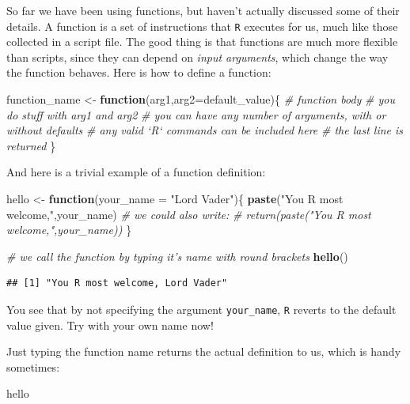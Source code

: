 \documentclass[]{book}
\newenvironment{Shaded}{\begin{snugshade}}{\end{snugshade}}
\newcommand{\KeywordTok}[1]{\textcolor[rgb]{0.13,0.29,0.53}{\textbf{#1}}}
\newcommand{\DataTypeTok}[1]{\textcolor[rgb]{0.13,0.29,0.53}{#1}}
\newcommand{\StringTok}[1]{\textcolor[rgb]{0.31,0.60,0.02}{#1}}
\newcommand{\CommentTok}[1]{\textcolor[rgb]{0.56,0.35,0.01}{\textit{#1}}}
\newcommand{\ControlFlowTok}[1]{\textcolor[rgb]{0.13,0.29,0.53}{\textbf{#1}}}
\newcommand{\NormalTok}[1]{#1}
\begin{document}
So far we have been using functions, but haven't actually discussed some
of their details. A function is a set of instructions that \texttt{R}
executes for us, much like those collected in a script file. The good
thing is that functions are much more flexible than scripts, since they
can depend on \emph{input arguments}, which change the way the function
behaves. Here is how to define a function:

\begin{Shaded}
\begin{Highlighting}[]
\NormalTok{function_name <-}\StringTok{ }\ControlFlowTok{function}\NormalTok{(arg1,}\DataTypeTok{arg2=}\NormalTok{default_value)\{}
  \CommentTok{# function body}
  \CommentTok{# you do stuff with arg1 and arg2}
  \CommentTok{# you can have any number of arguments, with or without defaults}
  \CommentTok{# any valid `R` commands can be included here}
  \CommentTok{# the last line is returned}
\NormalTok{\}}
\end{Highlighting}
\end{Shaded}

And here is a trivial example of a function definition:

\begin{Shaded}
\begin{Highlighting}[]
\NormalTok{hello <-}\StringTok{ }\ControlFlowTok{function}\NormalTok{(}\DataTypeTok{your_name =} \StringTok{"Lord Vader"}\NormalTok{)\{}
  \KeywordTok{paste}\NormalTok{(}\StringTok{"You R most welcome,"}\NormalTok{,your_name)}
  \CommentTok{# we could also write:}
  \CommentTok{# return(paste("You R most welcome,",your_name))}
\NormalTok{\}}

\CommentTok{# we call the function by typing it's name with round brackets}
\KeywordTok{hello}\NormalTok{()}
\end{Highlighting}
\end{Shaded}

\begin{verbatim}
## [1] "You R most welcome, Lord Vader"
\end{verbatim}

You see that by not specifying the argument \texttt{your\_name},
\texttt{R} reverts to the default value given. Try with your own name
now!

Just typing the function name returns the actual definition to us, which
is handy sometimes:

\begin{Shaded}
\begin{Highlighting}[]
\NormalTok{hello}
\end{Highlighting}
\end{Shaded}
\end{document}
